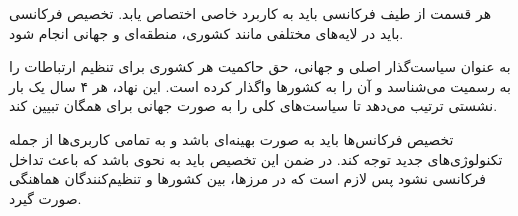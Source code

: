 {
	هر قسمت‌‌ از طیف فرکانسی باید به کاربرد خاصی اختصاص یابد. تخصیص فرکانسی باید در لایه‌های مختلفی مانند کشوری، منطقه‌ای و جهانی انجام شود.
	
	به عنوان سیاست‌گذار اصلی و جهانی، حق حاکمیت هر کشوری برای تنظیم ارتباطات را به رسمیت می‌شناسد و آن را به کشورها واگذار کرده است. این نهاد، هر ۴ سال یک بار نشستی ترتیب می‌دهد تا سیاست‌های کلی را به صورت جهانی برای همگان تبیین کند.
	
	تخصیص فرکانس‌ها باید به صورت بهینه‌ای باشد و به تمامی کاربری‌ها از جمله تکنولوژی‌های جدید توجه کند. در ضمن این تخصیص باید به نحوی باشد که باعث تداخل فرکانسی نشود پس لازم است که در مرزها، بین کشورها و تنظیم‌کنندگان هماهنگی صورت گیرد.
}